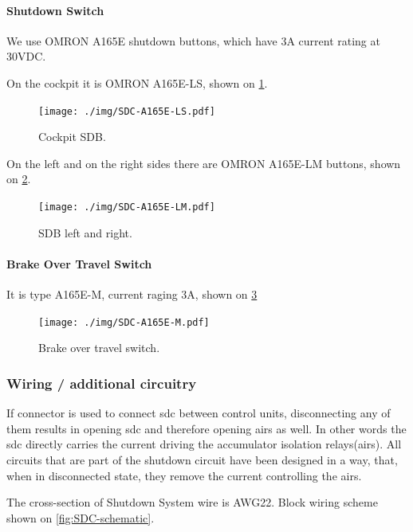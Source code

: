 \paragraph{Shutdown Switch}
We use OMRON A165E shutdown buttons, which have 3A current rating at 30VDC.

On the cockpit it is OMRON A165E-LS, shown on \ref{fig:SDC-A165E-LS}.
\begin{figure}[H]
	\centering
	\texttt{[image: ./img/SDC-A165E-LS.pdf]}
	\caption{Cockpit SDB.}
	\label{fig:SDC-A165E-LS}
\end{figure}

On the left and on the right sides there are OMRON A165E-LM buttons, shown on \ref{fig:SDC-A165E-LM}.
\begin{figure}[H]
	\centering
	\texttt{[image: ./img/SDC-A165E-LM.pdf]}
	\caption{SDB left and right.}
	\label{fig:SDC-A165E-LM}
\end{figure}

\paragraph{Brake Over Travel Switch}
It is type A165E-M, current raging 3A, shown on \ref{fig:SDC-A165E-M}
\begin{figure}[H]
	\centering
	\texttt{[image: ./img/SDC-A165E-M.pdf]}
	\caption{Brake over travel switch.}
	\label{fig:SDC-A165E-M}
\end{figure}


\subsubsection{Wiring / additional circuitry}

If connector is used to connect \gls{sdc} between control units, disconnecting any of them results in opening \gls{sdc} and therefore opening \glspl{air} as well. In other words the \gls{sdc} directly carries the current driving the accumulator isolation relays(\glspl{air}). All circuits that are part of the shutdown circuit have been designed in a way, that, when in disconnected state, they remove the current controlling the \glspl{air}.

The cross-section of Shutdown System wire is AWG22. Block wiring scheme shown on \ref{fig:SDC-schematic}.\\

